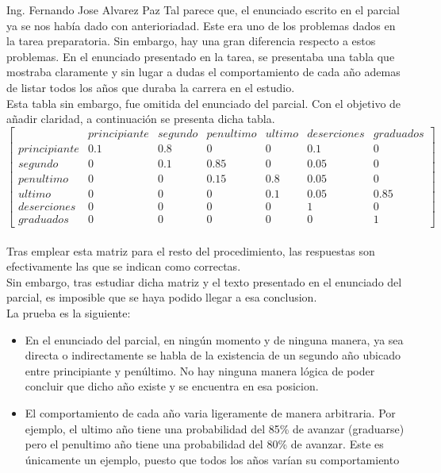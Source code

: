 \documentclass{letter}
\begin{document}
\begin{letter}{Ing. Fernando Jose Alvarez Paz}
  Tal parece que, el enunciado escrito en el parcial ya se nos había dado
  con anterioriadad. Este era uno de los problemas dados en la tarea
  preparatoria. Sin embargo, hay una gran diferencia respecto a estos 
  problemas. En el enunciado presentado en la tarea, se presentaba 
  una tabla que mostraba claramente y sin lugar a dudas el comportamiento
  de cada año ademas de listar todos los años que duraba la carrera
  en el estudio. \\
  Esta tabla sin embargo, fue omitida del enunciado del parcial. Con el
  objetivo de añadir claridad, a continuación se presenta dicha tabla.\\
  $\left[\begin{matrix}  & principiante & segundo & penultimo & ultimo & deserciones & graduados\\principiante & 0.1 & 0.8 & 0 & 0 & 0.1 & 0\\segundo & 0 & 0.1 & 0.85 & 0 & 0.05 & 0\\penultimo & 0 & 0 & 0.15 & 0.8 & 0.05 & 0\\ultimo & 0 & 0 & 0 & 0.1 & 0.05 & 0.85\\deserciones & 0 & 0 & 0 & 0 & 1 & 0\\graduados & 0 & 0 & 0 & 0 & 0 & 1\end{matrix}\right]$ \\\\
  Tras emplear esta matriz para el resto del procedimiento, 
  las respuestas son efectivamente las que se indican como correctas. \\
  Sin embargo, tras estudiar dicha matriz y el texto presentado en 
  el enunciado del parcial, es imposible que se haya podido llegar a 
  esa conclusion. \\ La prueba es la siguiente: \\
  \begin {itemize}
  \item En el enunciado del parcial, en ningún momento
    y de ninguna manera, ya sea directa o 
    indirectamente se habla de la existencia de un segundo año 
    ubicado entre principiante y penúltimo. No hay ninguna manera 
    lógica de poder concluir que dicho año existe y se encuentra en 
    esa posicion.
  \item El comportamiento de cada año varia ligeramente de manera
    arbitraria. Por ejemplo, el ultimo año tiene una probabilidad 
    del 85\% de avanzar (graduarse) pero el penultimo año 
    tiene una probabilidad del 80\% de avanzar. Este es únicamente 
    un ejemplo, puesto que todos los años varían su comportamiento

\end{itemize}
\end{letter}
\end{document}

